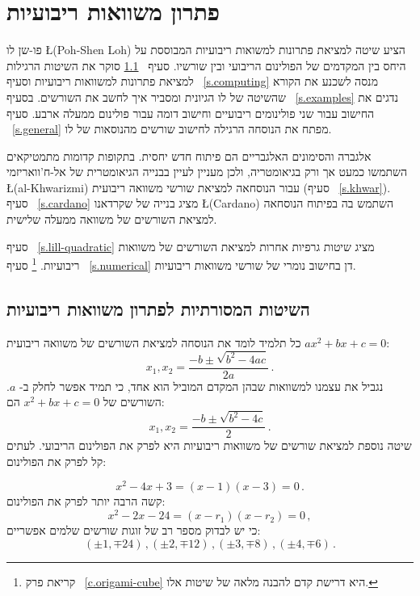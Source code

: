 

\chapter{פתרון משוואות ריבועיות}\label{c.quadratic}
פו-שן לו
\L{(Poh-Shen Loh)}
הציע שיטה למציאת פתרונות למשואות ריבועיות המבוססת על היחס בין המקדמים של הפולינום הריבועי ובין שורשיו. סעיף%
~\ref{s.traditional}
סוקר את השיטות הרגילות למציאת פתרונות למשוואות ריבועיות וסעיף%
~\ref{s.computing}
מנסה לשכנע את הקורא שהשיטה של לו
הגיונית ומסביר איך לחשב את השורשים. בסעיף%
~\ref{s.examples}
נדגים את החישוב עבור שני פולינומים ריבועיים וחישוב דומה עבור פולינום ממעלה ארבע. סעיף%
~\ref{s.general}
מפתח את הנוסחה הרגילה לחישוב שורשים מהנוסאות של לו.

אלגברה והסימונים האלגבריים הם פיתוח חדש יחסית. בתקופות קדומות מתמטיקאים השתמשו כמעט אך ורק בגיאומטריה, ולכן מעניין לעיין בבנייה הגיאומטרית של אל-ח'וואריזמי
\L{(al-Khwarizmi)}
עבור הנוסחאה למציאת שורשי משוואה ריבועית (סעיף%
~\ref{s.khwar}).
סעיף%
~\ref{s.cardano}
מציג בנייה של שקרדאנו
\L{(Cardano)}
השתמש בה בפיתוח הנוסחאה למציאת השורשים של משוואה ממעלה שלישית.

סעיף%
~\ref{s.lill-quadratic}
מציג שיטות גרפיות אחרות למציאת השורשים של משוואות ריבועיות.%
\footnote{קריאת פרק%
~\ref{c.origami-cube}
היא דרישת קדם להבנה מלאה של שיטות אלו.}
סעיף%
~\ref{s.numerical}
דן בחישוב נומרי של שורשי משוואות ריבועיות.


\section{השיטות המסורתיות לפתרון משוואות ריבועיות}\label{s.traditional}

כל תלמיד לומד את הנוסחה למציאת השורשים של משוואה ריבועית
$ax^2+bx+c=0$:
\[
x_1, x_2 = \frac{-b\pm\sqrt{b^2-4ac}}{2a}\,.
\]
נגביל את עצמנו למשוואות שבהן המקדם המוביל הוא אחד, כי תמיד אפשר לחלק ב-%
$a$.
השורשים של
$x^2+bx+c=0$
הם:
\begin{equation}\label{eq.quadratic-roots}
x_1, x_2 = \frac{-b\pm\sqrt{b^2-4c}}{2}\,.
\end{equation}
שיטה נוספת למציאת שורשים של משוואות ריבועיות היא לפרק את הפולינום הריבועי. לעתים קל לפרק את הפולינום:

\begin{equation}\label{eq.quadratic-lill}
x^2-4x+3= (x-1)(x-3)=0\,.
\end{equation}
קשה הרבה יותר לפרק את הפולינום:
\[
x^2-2x-24= (x-r_1)(x-r_2)=0\,,
\]
כי יש לבדוק מספר רב של זוגות שורשים שלמים אפשריים:
\[
(\pm 1,\mp 24)\,, (\pm 2,\mp 12)\,, (\pm 3,\mp 8)\,, (\pm 4,\mp 6)\,.
\]

